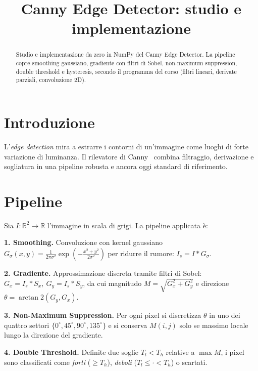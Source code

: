 \documentclass[conference]{IEEEtran}
\begin{document}
\title{Canny Edge Detector: studio e implementazione}

\author{
}

\maketitle

\begin{abstract}
Studio e implementazione da zero in NumPy del Canny Edge Detector. La pipeline
copre smoothing gaussiano, gradiente con filtri di Sobel, non-maximum
suppression, double threshold e hysteresis, secondo il programma del corso
(filtri lineari, derivate parziali, convoluzione 2D).
\end{abstract}

\section{Introduzione}
L'\textit{edge detection} mira a estrarre i contorni di un'immagine come luoghi
di forte variazione di luminanza. Il rilevatore di Canny~\cite{canny1986}
combina filtraggio, derivazione e sogliatura in una pipeline robusta e ancora
oggi standard di riferimento.

\section{Pipeline}
Sia $I:\mathbb{R}^2\to\mathbb{R}$ l'immagine in scala di grigi. La pipeline
applicata \`e:

\textbf{1. Smoothing.} Convoluzione con kernel gaussiano
$G_\sigma(x,y)=\frac{1}{2\pi\sigma^2}\exp\!\left(-\frac{x^2+y^2}{2\sigma^2}\right)$
per ridurre il rumore: $I_s = I * G_\sigma$.

\textbf{2. Gradiente.} Approssimazione discreta tramite filtri di Sobel:
$G_x = I_s * S_x,\ G_y = I_s * S_y$, da cui magnitudo
$M=\sqrt{G_x^2+G_y^2}$ e direzione $\theta=\arctan2(G_y,G_x)$.

\textbf{3. Non-Maximum Suppression.} Per ogni pixel si discretizza $\theta$ in
uno dei quattro settori $\{0^\circ,45^\circ,90^\circ,135^\circ\}$ e si conserva
$M(i,j)$ solo se massimo locale lungo la direzione del gradiente.

\textbf{4. Double Threshold.} Definite due soglie $T_l<T_h$ relative a
$\max M$, i pixel sono classificati come \emph{forti} ($\ge T_h$),
\emph{deboli} ($T_l\le \cdot < T_h$) o scartati.
\end{document}
